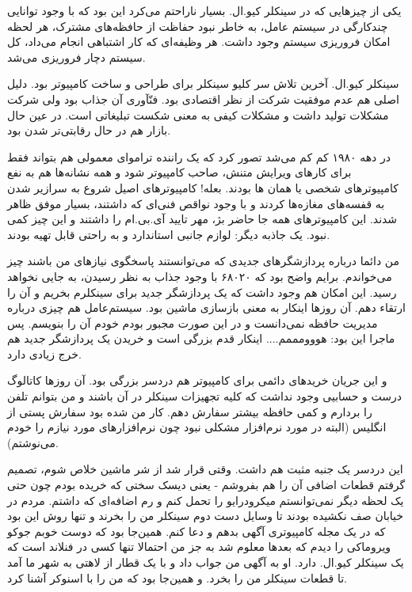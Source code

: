 یکی از چیزهایی که در سینکلر کیو.ال. بسیار ناراحتم می‌کرد این بود که با
وجود توانایی چندکارگی در سیستم عامل، به خاطر نبود حفاظت از حافظه‌‌های
مشترک، هر لحظه امکان فروریزی سیستم وجود داشت. هر وظیفه‌ای که کار
اشتباهی انجام می‌داد، کل سیستم دچار فروریزی می‌شد.

سینکلر کیو.ال. آخرین تلاش سر کلیو سینکلر برای طراحی و ساخت کامپیوتر
بود. دلیل اصلی هم عدم موفقیت شرکت از نظر اقتصادی بود. فنّآوری آن جذاب
بود ولی شرکت مشکلات تولید داشت و مشکلات کیفی به معنی شکست تبلیغاتی
است. در عین حال بازار هم در حال رقابتی‌تر شدن بود.

در دهه ۱۹۸۰ کم کم می‌شد تصور کرد که یک راننده تراموای معمولی هم بتواند
فقط برای کارهای ویرایش متنش، صاحب کامپیوتر شود و همه نشانه‌ها هم به نفع
کامپیوترهای شخصی یا همان  ها بودند. بعله!‌ کامپیوترهای اصیل
 شروع به سرازیر شدن به قفسه‌های مغازه‌ها کردند و با وجود
نواقص فنی‌ای که داشتند، بسیار موفق ظاهر شدند. این کامپیوترهای همه جا
حاضر بژ، مهر تایید آی.بی.ام را داشتند و این چیز کمی نبود. یک جاذبه
دیگر: لوازم جانبی استاندارد و به راحتی قابل تهیه بودند.

من دائما درباره پردازشگرهای جدیدی که می‌توانستند پاسخگوی نیازهای من
باشند چیز می‌خواندم. برایم واضح بود که ۶۸۰۲۰ با وجود جذاب به نظر رسیدن،
به جایی نخواهد رسید. این امکان هم وجود داشت که یک پردازشگر جدید برای
سینکلرم بخریم و آن را ارتقاء دهم. آن روزها اینکار به معنی بازسازی
ماشین بود. سیستم‌عامل هم چیزی درباره مدیریت حافظه نمی‌دانست و در این
صورت مجبور بودم خودم آن را بنویسم. پس ماجرا این بود:
هووومممم.... اینکار قدم بزرگی است و خریدن یک پردازشگر جدید هم خرج
زیادی دارد.

و این جریان خریدهای دائمی برای کامپیوتر هم دردسر بزرگی بود. آن روزها
کاتالوگ درست و حسابیی وجود نداشت که کلیه تجهیزات سینکلر در آن باشند و
من بتوانم تلفن را بردارم و کمی حافظه بیشتر سفارش دهم. کار من شده بود
سفارش پستی از انگلیس (البته در مورد نرم‌افزار مشکلی نبود چون
نرم‌افزارهای مورد نیازم را خودم می‌نوشتم).

این دردسر یک جنبه مثبت هم داشت. وقتی قرار شد از شر ماشین خلاص شوم،
تصمیم‌ گرفتم قطعات اضافی آن را هم بفروشم - یعنی دیسک سختی که خریده بودم
چون حتی یک لحظه دیگر نمی‌توانستم میکرودرایو را تحمل کنم و رم اضافه‌ای که
داشتم. مردم در خیابان صف نکشیده بودند تا وسایل دست دوم سینکلر من را
بخرند و تنها روش این بود که در یک مجله کامپیوتری آگهی بدهم و دعا
کنم. همین‌جا بود که دوست خوبم جوکو ویروماکی
را دیدم که بعدها معلوم شد به جز من احتمالا تنها کسی در فنلاند است که
یک سینکلر کیو.ال. دارد. او به آگهی من جواب داد و با یک قطار از
لاهتی به شهر ما آمد تا قطعات سینکلر من را بخرد. و
همین‌جا بود که من را با اسنوکر آشنا کرد.

